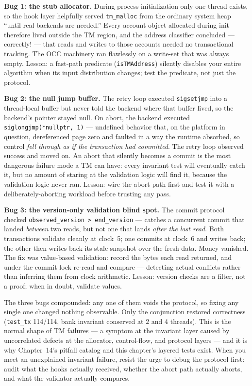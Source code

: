 \textbf{Bug 1: the stub allocator.} During process initialization only one
thread exists, so the hook layer helpfully served \texttt{tm\_malloc} from the
ordinary system heap ``until real backends are needed.'' Every account object
allocated during init therefore lived outside the TM region, and the address
classifier concluded --- correctly! --- that reads and writes to those accounts
needed no transactional tracking. The OCC machinery ran flawlessly on a
write-set that was always empty. Lesson: a fast-path predicate
(\texttt{isTMAddress}) silently disables your entire algorithm when its input
distribution changes; test the predicate, not just the protocol.

\textbf{Bug 2: the null jump buffer.} The retry loop executed
\texttt{sigsetjmp} into a thread-local buffer but never told the backend where
that buffer lived, so the backend's pointer stayed null. On abort, the backend
executed \texttt{siglongjmp(*nullptr, 1)} --- undefined behavior that, on the
platform in question, dereferenced page zero and faulted in a way the runtime
absorbed, so control \emph{fell through as if the transaction had committed}.
The retry loop observed success and moved on. An abort that silently becomes a
commit is the most dangerous failure mode a TM can have: every invariant test
will eventually catch it, but no amount of staring at the validation logic
will find it, because the validation logic never ran. Lesson: wire the
abort path first and test it with a deliberately-aborting workload before
trusting any pass.

\textbf{Bug 3: the version-only validation blind spot.} The commit protocol
checked \texttt{observed\_version > end\_version} --- catches a concurrent
commit that landed \emph{between} two reads, but not one that lands
\emph{after the last read}. Both transactions validate cleanly at clock~5;
one commits at clock~6 and writes back; the other then writes back its stale
snapshot over the fresh data. Money vanished. The fix was value-based
validation: record the bytes each read returned, and under the commit lock
re-read and compare --- detecting actual conflicts rather than inferring them
from clock arithmetic. Lesson: version checks are a filter, not a proof;
when in doubt, validate values.

The three bugs compounded: any one of them voids the protocol, so fixing any
single one changed nothing observable. Only the conjunction restored
correctness (\texttt{test\_tx} 114/114, bank invariant conserved at 2 and 4
threads). This is the normal shape of TM failures --- a symptom at the
invariant layer caused by uncorrelated defects at the allocator, control-flow,
and protocol layers --- and it is why Chapter~14's pitfall catalog and this
chapter's layered tests exist. When you meet an unexplained invariant failure,
resist the urge to debug the protocol first: audit what the hooks actually
received, whether the abort path actually aborts, and what the validator
actually compares.



